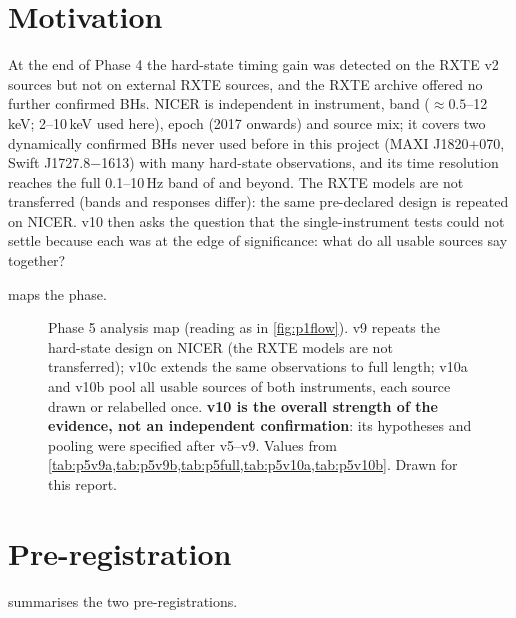 \section{Motivation}
At the end of Phase 4 the hard-state timing gain was detected on the RXTE v2 sources but not on external RXTE sources, and
the RXTE archive offered no further confirmed BHs. NICER is independent in instrument, band ($\approx0.5$--12\,keV; 2--10\,keV
used here), epoch (2017 onwards) and source mix; it covers two dynamically confirmed BHs never used before in this project
(MAXI J1820+070, Swift J1727.8$-$1613) with many hard-state observations, and its time resolution reaches the full 0.1--10\,Hz
band of \citet{RemillardMcClintock2006} and beyond. The RXTE models are not transferred (bands and responses differ): the same
pre-declared design is repeated on NICER. v10 then asks the question that the single-instrument tests could not settle
because each was at the edge of significance: what do all usable sources say together?

 maps the phase.

\begin{figure}[htbp]
\centering

\caption[Phase 5 analysis map]{Phase 5 analysis map (reading as in \cref{fig:p1flow}). v9 repeats the hard-state design on NICER
(the RXTE models are not transferred); v10c extends the same observations to full length; v10a and v10b pool all usable
sources of both instruments, each source drawn or relabelled once. \textbf{v10 is the overall strength of the evidence, not an
independent confirmation}: its hypotheses and pooling were specified after v5--v9. Values from
\cref{tab:p5v9a,tab:p5v9b,tab:p5full,tab:p5v10a,tab:p5v10b}. Drawn for this report.}
\label{fig:p5flow}
\end{figure}

\section{Pre-registration}
 summarises the two pre-registrations.

